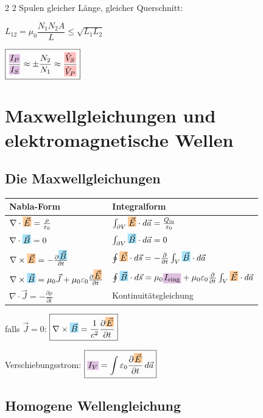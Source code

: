 \documentclass[10pt,a4paper]{article}
\newcommand{\icc}[1]{{\setlength\fboxsep{1pt}\colorbox{violet!25}{\ensuremath{#1}}}}
\newcommand{\efc}[1]{{\setlength\fboxsep{1pt}\colorbox{orange!40}{\ensuremath{#1}}}}
\newcommand{\bfc}[1]{{\setlength\fboxsep{1pt}\colorbox{cyan!35}{\ensuremath{#1}}}}
\newcommand{\vc}[1]{{\setlength\fboxsep{1pt}\colorbox{red!25}{\ensuremath{#1}}}}
\begin{document}
\begin{multicols}{2}
2 Spulen gleicher Länge, gleicher Querschnitt:

$L_{12}=\mu_0\dfrac{N_1 N_2 A}{L}\leq\sqrt{L_1 L_2}$

$\boxed{\dfrac{\icc{I_P}}{\icc{I_S}}\approx\pm\dfrac{N_2}{N_1}\approx\dfrac{\vc{\hat{V}_S}}{\vc{\hat{V}_P}}}$

\section{Maxwellgleichungen und elektromagnetische Wellen}

\subsection{Die Maxwellgleichungen}

{\footnotesize\renewcommand{\arraystretch}{1.3}
\begin{tabularx}{\linewidth}{|X|X|}
\hline
Nabla-Form & Integralform \\
\hline
$\nabla\cdot\efc{\vec{E}}=\frac{\rho}{\varepsilon_0}$ & $\int_{\partial V}\efc{\vec{E}}\cdot d\vec{a}=\frac{Q_{\text{in}}}{\varepsilon_0}$ \\
$\nabla\cdot\bfc{\vec{B}}=0$ & $\int_{\partial V}\bfc{\vec{B}}\cdot d\vec{a}=0$ \\
$\nabla\times\efc{\vec{E}}=-\frac{\partial\bfc{\vec{B}}}{\partial t}$ & $\oint\efc{\vec{E}}\cdot d\vec{s}=-\frac{\partial}{\partial t}\int_V\bfc{\vec{B}}\cdot d\vec{a}$ \\
$\nabla\times\bfc{\vec{B}}=\mu_0\vec{J}+\mu_0\varepsilon_0\frac{\partial\efc{\vec{E}}}{\partial t}$ & $\oint\bfc{\vec{B}}\cdot d\vec{s}=\mu_0 \icc{I_{\text{eing}}}+\mu_0\varepsilon_0\frac{\partial}{\partial t}\int_V\efc{\vec{E}}\cdot d\vec{a}$ \\
$\nabla\cdot\vec{J}=-\frac{\partial\rho}{\partial t}$ & Kontinuitätsgleichung \\
\hline
\end{tabularx}}

falls $\vec{J}=0$: $\boxed{\nabla\times\bfc{\vec{B}}=\dfrac{1}{c^2}\dfrac{\partial\efc{\vec{E}}}{\partial t}}$

Verschiebungsstrom: $\boxed{\icc{I_V}=\int\varepsilon_0\dfrac{\partial\efc{\vec{E}}}{\partial t}\,d\vec{a}}$

\subsection{Homogene Wellengleichung}


\end{multicols}
\end{document}
